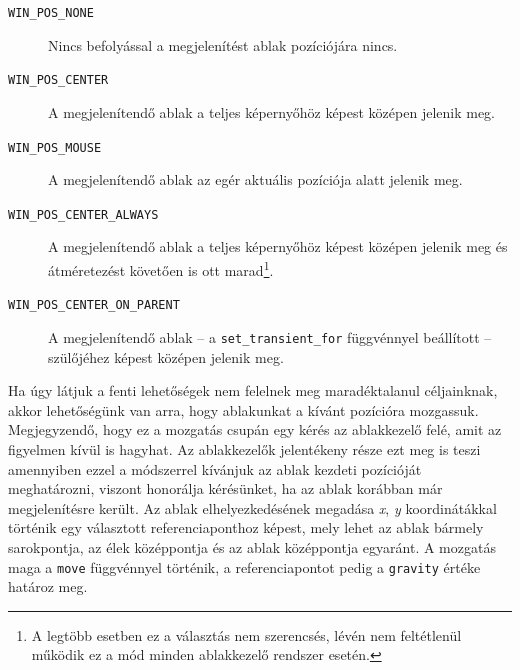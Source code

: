 \begin{description}
 \item[\texttt{WIN\_POS\_NONE}] Nincs befolyással a megjelenítést ablak pozíciójára nincs.

 \item[\texttt{WIN\_POS\_CENTER}] A megjelenítendő ablak a teljes képernyőhöz képest középen jelenik meg.

 \item[\texttt{WIN\_POS\_MOUSE}] A megjelenítendő ablak az egér aktuális pozíciója alatt jelenik meg.

 \item[\texttt{WIN\_POS\_CENTER\_ALWAYS}] A megjelenítendő ablak a teljes képernyőhöz képest középen jelenik meg és átméretezést követően is ott marad\footnote{A legtöbb esetben ez a választás nem szerencsés, lévén nem feltétlenül működik ez a mód minden ablakkezelő rendszer esetén.}.

 \item[\texttt{WIN\_POS\_CENTER\_ON\_PARENT}] A megjelenítendő ablak -- a \texttt{set\_transient\_for} függvénnyel beállított -- szülőjéhez képest középen jelenik meg.
\end{description}

Ha úgy látjuk a fenti lehetőségek nem felelnek meg maradéktalanul céljainknak, akkor lehetőségünk van arra, hogy ablakunkat a kívánt pozícióra mozgassuk. Megjegyzendő, hogy ez a mozgatás csupán egy kérés az ablakkezelő felé, amit az figyelmen kívül is hagyhat. Az ablakkezelők jelentékeny része ezt meg is teszi amennyiben ezzel a módszerrel kívánjuk az ablak kezdeti pozícióját meghatározni, viszont honorálja kérésünket, ha az ablak korábban már megjelenítésre került. Az ablak elhelyezkedésének megadása \textit{x}, \textit{y} koordinátákkal történik egy választott referenciaponthoz képest, mely lehet az ablak bármely sarokpontja, az élek középpontja és az ablak középpontja egyaránt. A mozgatás maga a \texttt{move} függvénnyel történik, a referenciapontot pedig a \texttt{gravity} értéke határoz meg.

